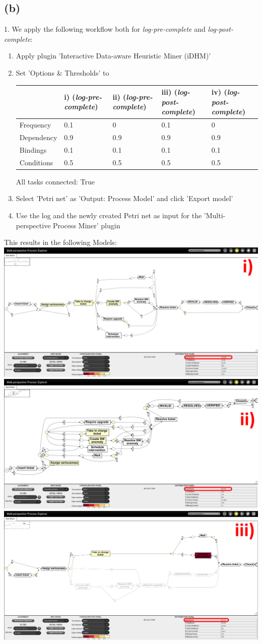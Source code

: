 \documentclass[../../main.tex]{subfiles}
\begin{document}
\subsection*{(b)}
1. We apply the following workflow both for \textit{log-pre-complete} and \textit{log-post-complete}:
\begin{enumerate}
\item Apply plugin 'Interactive Data-aware Heuristic Miner (iDHM)'
\item Set 'Options \& Thresholds' to\\
\begin{table}[h!]
\begin{tabular}{l|llll}
           & i) (\textit{log-pre-complete}) & ii) (\textit{log-pre-complete}) & iii) (\textit{log-post-complete}) & iv) (\textit{log-post-complete})\\
           \hline
Frequency  & 0.1 & 0   & 0.1  & 0   \\
Dependency & 0.9 & 0.9 & 0.9  & 0.9 \\
Bindings   & 0.1 & 0.1 & 0.1  & 0.1 \\
Conditions & 0.5 & 0.5 & 0.5  & 0.5
\end{tabular}
\end{table}
All tasks connected: True
\item Select 'Petri net' as 'Output: Process Model' and click 'Export model'
\item Use the log and the newly created Petri net as input for the 'Multi-perspective Process Miner' plugin
\end{enumerate}
This results in the following Models:\\
\includegraphics[width=0.5\columnwidth]{img/ProM_b_1i.png}
\includegraphics[width=0.5\columnwidth]{img/ProM_b_1ii.png}
\includegraphics[width=0.5\columnwidth]{img/ProM_b_1iii.png}
\end{document}
